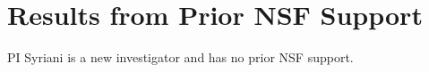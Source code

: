 
\section{Results from Prior NSF Support}\label{sec:prior-nsf}

PI Syriani is a new investigator and has no prior NSF support.
